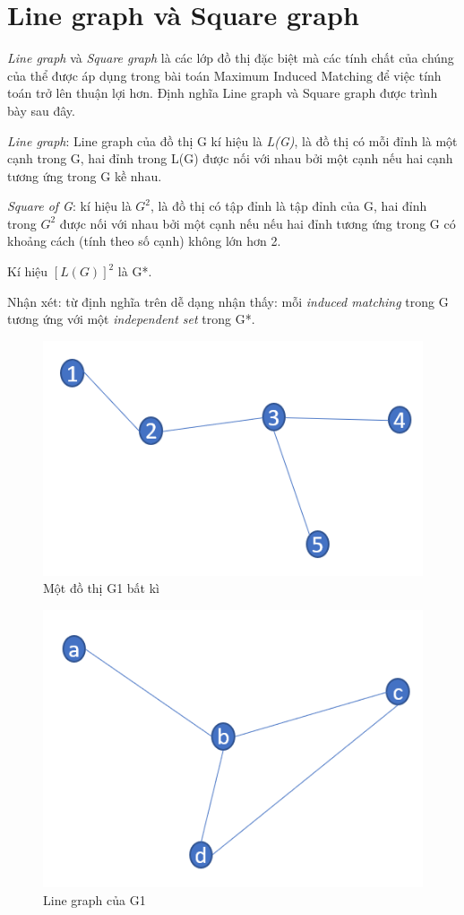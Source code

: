 \documentclass[14pt,a4paper]{extreport}
\begin{document}
\section{Line graph và Square graph}

\textit{Line graph} và \textit{Square graph} là các lớp đồ thị đặc biệt mà các tính chất của chúng của thể được áp dụng trong bài toán Maximum Induced Matching để việc tính toán trở lên thuận lợi hơn. Định nghĩa Line graph và Square graph được trình bày sau đây.

\textit{Line graph}:  Line graph của đồ thị G kí hiệu là \textit{L(G)}, là đồ thị có mỗi đỉnh là một cạnh trong G, hai đỉnh trong L(G) được nối với nhau bởi một cạnh nếu hai cạnh tương ứng trong G kề nhau. 

\textit{Square of G}: kí hiệu là $ G^{2} $, là đồ thị có tập đỉnh là tập đỉnh của G, hai đỉnh trong $ G^{2} $ được nối với nhau bởi một cạnh nếu nếu hai đỉnh tương ứng trong G có khoảng cách (tính theo số cạnh) không lớn hơn 2.

Kí hiệu $ [L(G)]^{2} $ là G*.

Nhận xét: từ định nghĩa trên dễ dạng nhận thấy: mỗi \textit{induced matching} trong G tương ứng với một \textit{independent set} trong G*.

\begin{figure}
	\centering
	\includegraphics[scale=.6]{g}
	\caption{Một đồ thị G1 bất kì}
\end{figure}

\begin{figure}
	\centering
	\includegraphics[scale=.5]{lineg}
	\caption{Line graph của G1}
\end{figure}
\end{document}
